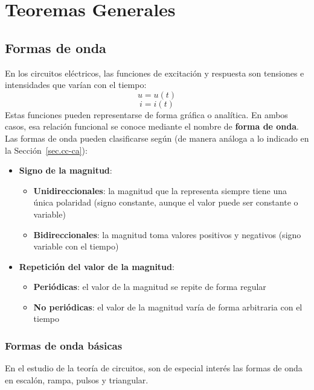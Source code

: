 \chapter{Teoremas Generales}\label{chap:teoremas}

\section{Formas de onda}
	
En los circuitos eléctricos, las funciones de excitación y respuesta
son tensiones e intensidades que varían con el tiempo:
\begin{equation*}
  u=u(t)
\end{equation*}
\begin{equation*}
  i=i(t)
\end{equation*}
Estas funciones pueden representarse de forma gráfica o analítica. En
ambos casos, esa relación funcional se conoce mediante el nombre de
\textbf{forma de onda}. Las formas de onda pueden clasificarse según
(de manera análoga a lo indicado en la Sección~\ref{sec.cc-ca}):
\begin{itemize}
\item \textbf{Signo de la magnitud}:
  \begin{itemize}
  \item \textbf{Unidireccionales}: la magnitud que la representa
    siempre tiene una única polaridad (signo constante, aunque el
    valor puede ser constante o variable)
  \item \textbf{Bidireccionales}: la magnitud toma valores positivos y
    negativos (signo variable con el tiempo)
  \end{itemize}
\item \textbf{Repetición del valor de la magnitud}:
  \begin{itemize}
  \item \textbf{Periódicas}: el valor de la magnitud se repite de
    forma regular
  \item \textbf{No periódicas}: el valor de la magnitud varía de forma
    arbitraria con el tiempo
  \end{itemize}
\end{itemize}

\subsection{Formas de onda básicas}
En el estudio de la teoría de circuitos, son de especial interés las
formas de onda en escalón, rampa, pulsos y triangular.
	
